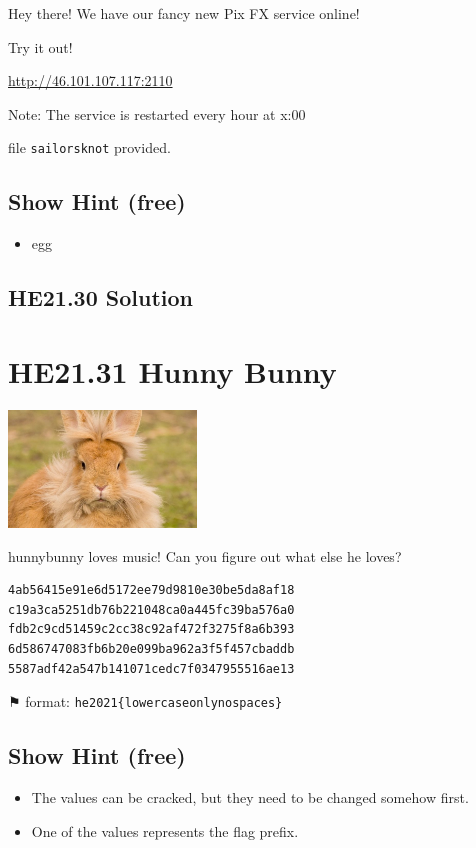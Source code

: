 \documentclass[english,a4paper,nols,noindent]{tufte-handout}
\begin{document}
\noindent Hey there! We have our fancy new Pix FX service online!

\noindent Try it out!

\url{http://46.101.107.117:2110}

Note: The service is restarted every hour at x:00

file \verb+sailorsknot+ provided.

\subsection{Show Hint (free)}
\begin{itemize}
\item egg
\end{itemize}

\hypertarget{he21.30-solution}{%
\subsection{HE21.30 Solution}\label{he21.30-solution}}

\noindent 


\hypertarget{he21.31}{%
\section{HE21.31 Hunny Bunny}
  \label{he21.31}}
\begin{marginfigure}
    \includegraphics[width=50mm]{images/challenge31.jpg}
\end{marginfigure}

\noindent hunnybunny loves music! Can you figure out what else he loves?

\begin{verbatim}
4ab56415e91e6d5172ee79d9810e30be5da8af18
c19a3ca5251db76b221048ca0a445fc39ba576a0
fdb2c9cd51459c2cc38c92af472f3275f8a6b393
6d586747083fb6b20e099ba962a3f5f457cbaddb
5587adf42a547b141071cedc7f0347955516ae13
\end{verbatim}

⚑ format: \verb+he2021{lowercaseonlynospaces}+

\subsection{Show Hint (free)}
\begin{itemize}
\item The values can be cracked, but they need to be changed somehow first.
\item One of the values represents the flag prefix.
\end{itemize}
\end{document}
